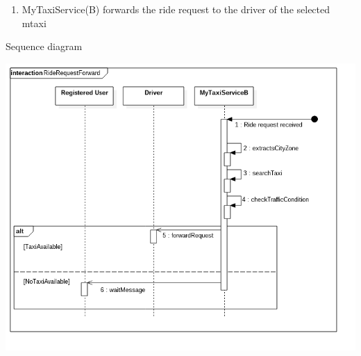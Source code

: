 \documentclass[11pt,titlepage]{article} %
\begin{document}
\begin{enumerate}
\begin{description}
\begin{enumerate}
			          \item MyTaxiService(B) forwards the ride request to the driver of the selected mtaxi
			\end{enumerate}
		\end{description}
		\newpage
		Sequence diagram
		\begin{center}
		\includegraphics[scale=0.52]{usecase3.png}
		\end{center}



\end{enumerate}
\end{document}
